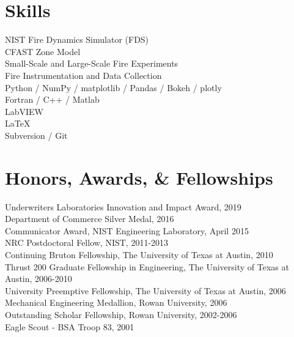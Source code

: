 \documentclass[10pt,letterpaper]{article}
\begin{document}

\section*{Skills}
NIST Fire Dynamics Simulator (FDS) \\
CFAST Zone Model \\
Small-Scale and Large-Scale Fire Experiments \\
Fire Instrumentation and Data Collection \\
Python / NumPy / matplotlib / Pandas / Bokeh / plotly \\
Fortran / C++ / Matlab \\
LabVIEW \\
\LaTeX \\
Subversion / Git \\

\section*{Honors, Awards, \& Fellowships}

Underwriters Laboratories Innovation and Impact Award, 2019 \\
Department of Commerce Silver Medal, 2016 \\
Communicator Award, NIST Engineering Laboratory, April 2015 \\
NRC Postdoctoral Fellow, NIST, 2011-2013 \\
Continuing Bruton Fellowship, The University of Texas at Austin, 2010 \\
Thrust 200 Graduate Fellowship in Engineering, The University of Texas at Austin, 2006-2010 \\
University Preemptive Fellowship, The University of Texas at Austin, 2006 \\
Mechanical Engineering Medallion, Rowan University, 2006 \\
Outstanding Scholar Fellowship, Rowan University, 2002-2006 \\
Eagle Scout - BSA Troop 83, 2001 \\
\end{document}
